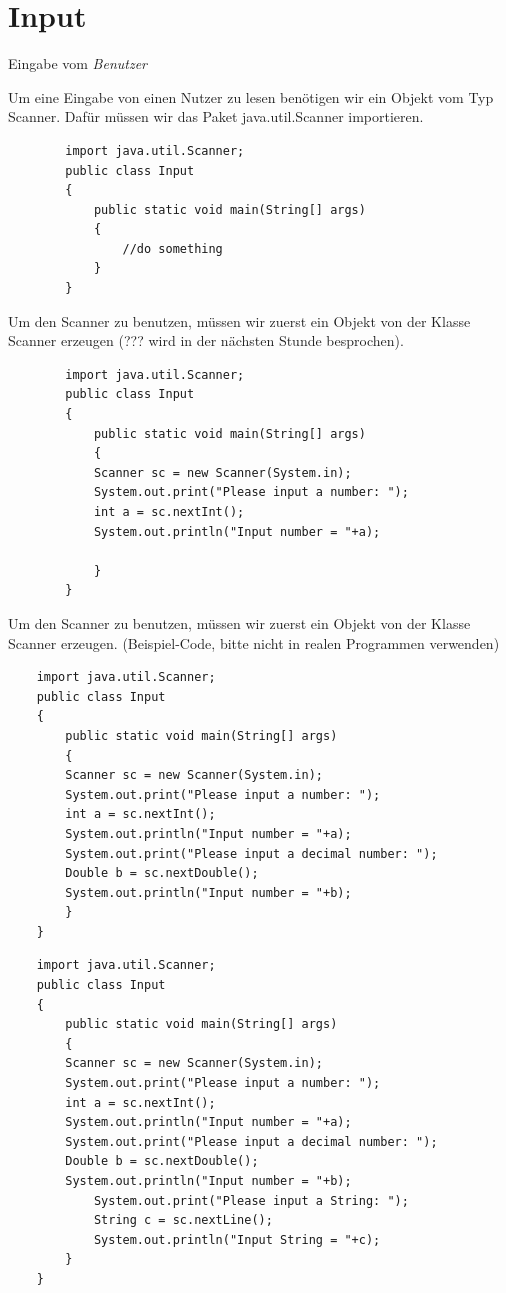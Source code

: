 \section{Input}
\begin{frame}{Eingabe vom \emph{Benutzer} }
	
	Um eine Eingabe von einen Nutzer zu lesen benötigen wir ein Objekt vom Typ Scanner. Dafür müssen wir das Paket java.util.Scanner importieren.
	
	\begin{lstlisting}
		import java.util.Scanner; 
		public class Input
		{
			public static void main(String[] args)
			{
				//do something
			}
		}
	\end{lstlisting}
\framebreak

	Um den Scanner zu benutzen, müssen wir zuerst ein Objekt von der Klasse Scanner erzeugen (??? wird in der nächsten Stunde besprochen).
	
	\begin{lstlisting}
		import java.util.Scanner; 
		public class Input
		{
			public static void main(String[] args)
			{
			Scanner sc = new Scanner(System.in);
			System.out.print("Please input a number: ");
			int a = sc.nextInt();
			System.out.println("Input number = "+a);
				
			}
		}
	\end{lstlisting}

\framebreak

Um den Scanner zu benutzen, müssen wir zuerst ein Objekt von der Klasse Scanner erzeugen. (Beispiel-Code, bitte nicht in realen Programmen verwenden)

\begin{lstlisting}
	import java.util.Scanner; 
	public class Input
	{
		public static void main(String[] args)
		{
		Scanner sc = new Scanner(System.in);
		System.out.print("Please input a number: ");
		int a = sc.nextInt();
		System.out.println("Input number = "+a);
		System.out.print("Please input a decimal number: ");
		Double b = sc.nextDouble();
		System.out.println("Input number = "+b);
		}
	}
\end{lstlisting}

\framebreak

\begin{lstlisting}
	import java.util.Scanner; 
	public class Input
	{
		public static void main(String[] args)
		{
		Scanner sc = new Scanner(System.in);
		System.out.print("Please input a number: ");
		int a = sc.nextInt();
		System.out.println("Input number = "+a);
		System.out.print("Please input a decimal number: ");
		Double b = sc.nextDouble();
		System.out.println("Input number = "+b);
			System.out.print("Please input a String: ");
			String c = sc.nextLine();
			System.out.println("Input String = "+c);	
		}
	}
\end{lstlisting}

\end{frame}



